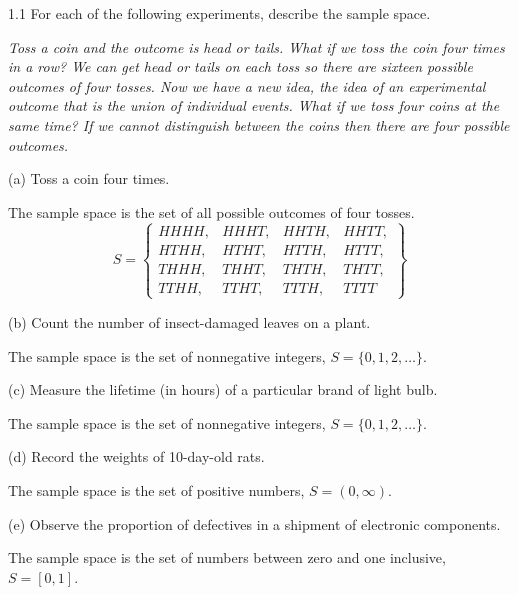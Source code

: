 \documentclass[12pt]{article}
\begin{document}
1.1
For each of the following experiments, describe the sample space.

\bigskip
\noindent
{\it Toss a coin and the outcome is head or tails.
What if we toss the coin four times in a row?
We can get head or tails on each toss so there are sixteen possible outcomes
of four tosses.
Now we have a new idea, the idea of an experimental outcome
that is the union of individual events.
What if we toss four coins at the same time?
If we cannot distinguish between the coins then there are four
possible outcomes.
}

\bigskip
\noindent
(a) Toss a coin four times.

\bigskip
The sample space is the set of all possible outcomes of four tosses.
\[
S=\left\{\begin{array}{llll}
HHHH, &HHHT, &HHTH, &HHTT,\\
HTHH, &HTHT, &HTTH, &HTTT,\\
THHH, &THHT, &THTH, &THTT,\\
TTHH, &TTHT, &TTTH, &TTTT
\end{array}\right\}
\]

\bigskip
\noindent
(b) Count the number of insect-damaged leaves on a plant.

\bigskip
The sample space is the set of nonnegative integers, $S=\{0,1,2,\ldots\}$.

\bigskip
\noindent
(c) Measure the lifetime (in hours) of a particular brand of light bulb.

\bigskip
The sample space is the set of nonnegative integers, $S=\{0,1,2,\ldots\}$.

\bigskip
\noindent
(d) Record the weights of 10-day-old rats.

\bigskip
The sample space is the set of positive numbers, $S=(0,\infty)$.

\bigskip
\noindent
(e) Observe the proportion of defectives in a shipment of electronic
components.

\bigskip
The sample space is the set of
numbers between zero and one inclusive,
$S=[0,1]$.
\end{document}
